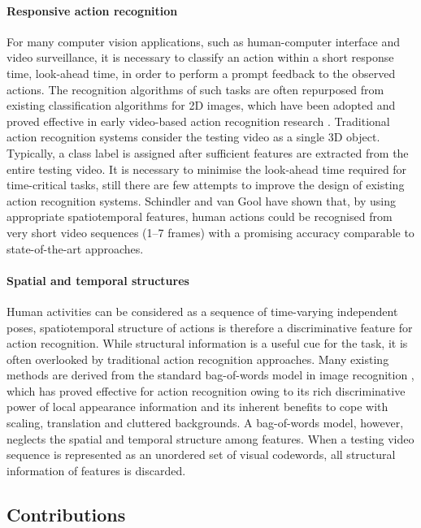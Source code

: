\paragraph{Responsive action recognition}  For many computer vision applications, such as human-computer interface and video surveillance, it is necessary to classify an action within a short response time, \ie look-ahead time, in order to perform a prompt feedback to the observed actions.  The recognition algorithms of such tasks are often repurposed from existing classification algorithms for 2D images, which have been adopted and proved effective in early video-based action recognition research \cite{Schuldt2004, Dollar2005}.  Traditional action recognition systems consider the testing video as a single 3D object. Typically, a class label is assigned after sufficient features are extracted from the entire testing video. It is necessary to minimise the look-ahead time required for time-critical tasks, still there are few attempts to improve the design of existing action recognition systems. Schindler and van Gool \cite{Schindler2008} have shown that, by using appropriate spatiotemporal features, human actions could be recognised from very short video sequences (1--7 frames) with a promising accuracy comparable to state-of-the-art approaches.

\paragraph{Spatial and temporal structures}
Human activities can be considered as a sequence of time-varying independent poses, spatiotemporal structure of actions is therefore a discriminative feature for action recognition.  
While structural information is a useful cue for the task, it is often overlooked by traditional action recognition approaches.  
Many existing methods are derived from the standard bag-of-words model in image recognition \cite{Sivic2005, Fei-Fei2005}, which has proved effective for action recognition owing to its rich discriminative power of local appearance information and its inherent benefits to cope with scaling, translation and cluttered backgrounds. 
A bag-of-words model, however, neglects the spatial and temporal structure among features. 
When a testing video sequence is represented as an unordered set of visual codewords, all structural information of features is discarded. 

\subsection{Contributions}

